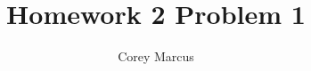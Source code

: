 \documentclass[]{article}
\title{Homework 2 Problem 1}
\author{Corey Marcus}
\begin{document}
\maketitle

\section{}
\end{document}
